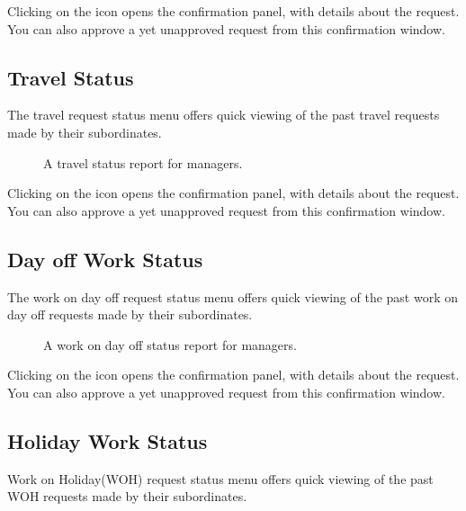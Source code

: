 \documentclass[letterpaper,10pt,english]{sphinxmanual}
\begin{document}
Clicking on the  \sphinxstyleemphasis{} icon opens the confirmation panel, with details about the request. You can also approve a yet unapproved request from this confirmation window.


\subsection{Travel Status}
\label{\detokenize{manager/status-reporting:travel-status}}
The travel request status menu offers quick viewing of the past travel requests made by their subordinates.

\begin{figure}[htbp]
\centering
\capstart

\noindent{}
\caption{A travel status report for managers.}\label{\detokenize{manager/status-reporting:id6}}\end{figure}

Clicking on the  \sphinxstyleemphasis{} icon opens the confirmation panel, with details about the request. You can also approve a yet unapproved request from this confirmation window.


\subsection{Day off Work Status}
\label{\detokenize{manager/status-reporting:day-off-work-status}}
The work on day off request status menu offers quick viewing of the past work on day off requests made by their subordinates.

\begin{figure}[htbp]
\centering
\capstart

\noindent{}
\caption{A work on day off status report for managers.}\label{\detokenize{manager/status-reporting:id7}}\end{figure}

Clicking on the  \sphinxstyleemphasis{} icon opens the confirmation panel, with details about the request. You can also approve a yet unapproved request from this confirmation window.


\subsection{Holiday Work Status}
\label{\detokenize{manager/status-reporting:holiday-work-status}}
Work on Holiday(WOH) request status menu offers quick viewing of the past WOH requests made by their subordinates.
\end{document}
